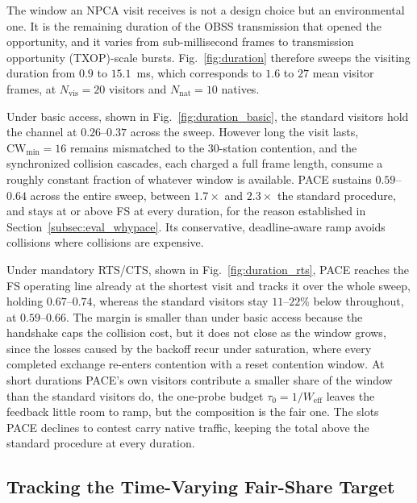 \documentclass[a4paper,fleqn]{cas-dc}
\newcommand{\Nvis}{N_\mathrm{vis}}
\newcommand{\Nnat}{N_\mathrm{nat}}
\begin{document}
The window an NPCA visit receives is not a design choice but an
environmental one. It is the remaining duration of the OBSS transmission
that opened the opportunity, and it varies from sub-millisecond frames to
transmission opportunity (TXOP)-scale bursts. Fig.~\ref{fig:duration} therefore sweeps the visiting
duration from $0.9$ to $15.1$~ms, which corresponds to $1.6$ to $27$ mean
visitor frames, at
$\Nvis=20$ visitors and $\Nnat=10$ natives.

Under basic access, shown in Fig.~\ref{fig:duration_basic}, the standard
visitors hold the channel at $0.26$--$0.37$ across the sweep. However
long the visit lasts, $\mathrm{CW}_{\min}=16$ remains mismatched to the
$30$-station contention, and the synchronized collision cascades, each
charged a full frame length, consume a roughly constant fraction of
whatever window is available. PACE sustains $0.59$--$0.64$ across the
entire sweep, between $1.7\times$ and $2.3\times$ the standard
procedure, and stays at or above FS at every duration, for the reason
established in Section~\ref{subsec:eval_whypace}. Its conservative,
deadline-aware ramp avoids collisions where collisions are expensive.

Under mandatory RTS/CTS, shown in Fig.~\ref{fig:duration_rts}, PACE reaches the
FS operating line already at the shortest visit and tracks it over the
whole sweep, holding $0.67$--$0.74$, whereas the standard visitors stay
$11$--$22\%$ below throughout, at $0.59$--$0.66$. The margin is smaller
than under basic access because the handshake caps the collision cost,
but it does not close as the window grows, since the losses caused by the backoff
recur under saturation, where every completed exchange
re-enters contention with a reset contention window. At short durations
PACE's own visitors contribute a smaller share of the window than the
standard visitors do, the one-probe budget
$\tau_0=1/W_\mathrm{eff}$ leaves the feedback little room to ramp, but
the composition is the fair one. The slots PACE declines to contest
carry native traffic, keeping the total above the standard procedure
at every duration.

\subsection{Tracking the Time-Varying Fair-Share Target}
\label{subsec:eval_tracking}
\end{document}
